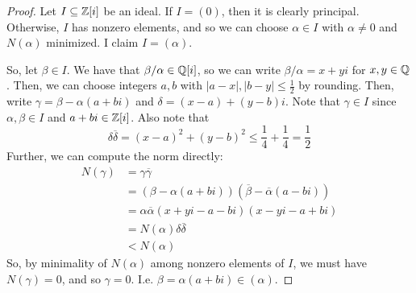 \begin{proof}
    Let $I \subseteq \mathbb{Z}[i]$ be an ideal. If $I = (0)$, then it is clearly principal. Otherwise, $I$ has nonzero elements, and so we can choose $\alpha \in I$ with $\alpha \neq 0$ and $N(\alpha)$ minimized. I claim $I = (\alpha)$.

    So, let $\beta \in I$. We have that $\beta/\alpha \in \mathbb{Q}[i]$, so we can write $\beta/\alpha = x+yi$ for $x,y \in \mathbb{Q}$. Then, we can choose integers $a,b$ with $|a-x|,|b-y| \leq \frac{1}{2}$ by rounding. Then, write $\gamma = \beta-\alpha(a+bi)$ and $\delta = (x-a)+(y-b)i$. Note that $\gamma \in I$ since $\alpha,\beta \in I$ and $a+bi \in \mathbb{Z}[i]$. Also note that
    \[ \delta\overline{\delta} = (x-a)^2+(y-b)^2 \leq \frac14+\frac14 = \frac12 \]
    Further, we can compute the norm directly:
    \begin{align*}
    N(\gamma)
        &= \gamma\overline{\gamma} \\
        &= (\beta-\alpha(a+bi))(\overline{\beta}-\overline{\alpha}(a-bi)) \\
        &= \alpha\overline{\alpha}(x+yi-a-bi)(x-yi-a+bi) \\
        &= N(\alpha)\delta\overline{\delta} \\
        &< N(\alpha)
    \end{align*}
    So, by minimality of $N(\alpha)$ among nonzero elements of $I$, we must have $N(\gamma) = 0$, and so $\gamma = 0$. I.e. $\beta = \alpha(a+bi) \in (\alpha)$.
\end{proof}